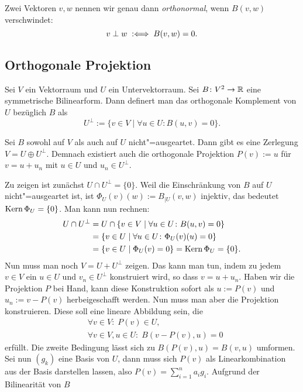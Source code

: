 Zwei Vektoren $v,w$ nennen wir genau dann \emph{orthonormal},
wenn $B(v,w)$ verschwindet:%
\begin{equation}
v\perp w \;:\Longleftrightarrow\; B(v,w)=0.
\end{equation}

\subsection{Orthogonale Projektion}

Sei $V$ ein Vektorraum und $U$ ein Untervektorraum. Sei
$B\colon V^2\to\mathbb R$ eine symmetrische Bilinearform. Dann definert
man das orthogonale Komplement
von $U$ bezüglich $B$ als%
\begin{equation}
U^\perp := \{v\in V\mid \forall u\in U\colon B(u,v)=0\}.
\end{equation}
\begin{theorem}
Sei $B$ sowohl auf $V$ als auch auf $U$ nicht"=ausgeartet.
Dann gibt es eine Zerlegung $V=U\oplus U^\perp$. Demnach
existiert auch die orthogonale Projektion $P(v):=u$
für $v=u+u_n$ mit $u\in U$ und $u_n\in U^\perp$.
\end{theorem}
 Zu zeigen ist zunächst $U\cap U^\perp=\{0\}$.
Weil die Einschränkung von $B$ auf $U$ nicht"=ausgeartet ist, ist
$\Phi_U(v)(w):=B_{|U}(v,w)$ injektiv, das bedeutet
$\operatorname{Kern}\Phi_U=\{0\}$. Man kann nun rechnen:%
\begin{align}
U\cap U^\perp &= U\cap\{v\in V\mid \forall u\in U\colon B(u,v)=0\}\\
&= \{v\in U\mid\forall u\in U\colon\Phi_U(v)(u)=0\}\\
&= \{v\in U\mid \Phi_U(v)=0\} = \operatorname{Kern}\Phi_U = \{0\}.
\end{align}
Nun muss man noch $V=U+U^\perp$ zeigen. Das kann man tun, indem
zu jedem $v\in V$ ein $u\in U$ und $v_n\in U^\perp$ konstruiert
wird, so dass $v=u+u_n$. Haben wir die Projektion $P$ bei Hand,
kann diese Konstruktion sofort als $u:=P(v)$ und $u_n:=v-P(v)$
herbeigeschafft werden. Nun muss man aber die Projektion
konstruieren. Diese soll eine lineare Abbildung sein, die%
\begin{align}
&\forall v\in V\colon\; P(v)\in U,\\
&\forall v\in V, u\in U\colon\; B(v-P(v),u) = 0
\end{align}
erfüllt. Die zweite Bedingung lässt sich zu $B(P(v),u)=B(v,u)$
umformen. Sei nun $(g_k)$ eine Basis von $U$, dann muss sich
$P(v)$ als Linearkombination aus der Basis darstellen lassen,
also $P(v)=\sum_{i=1}^n a_i g_i$. Aufgrund der Bilinearität von $B$
